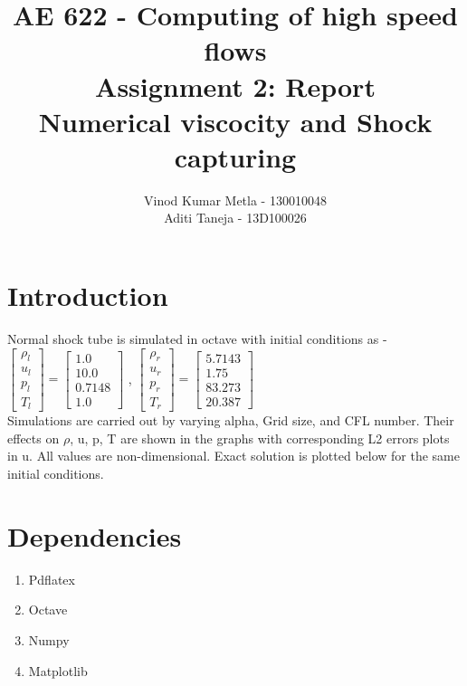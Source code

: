 \documentclass{article}
\title{AE 622 -  Computing of high speed flows\\ Assignment 2: Report \\ Numerical viscocity and Shock capturing}
\author{Vinod Kumar Metla - 130010048\\Aditi Taneja - 13D100026}
\date{}
\begin{document}
\maketitle
\newpage
\section*{Introduction}

Normal shock tube is simulated in octave with initial conditions as - 
\newline
    $\begin{bmatrix}
    \rho_l \\ 
    u_l \\
    p_l \\
    T_l
    \end{bmatrix} = \begin{bmatrix}
    1.0\\ 
    10.0 \\
    0.7148 \\
    1.0
    \end{bmatrix} $
 , 
$\begin{bmatrix}
    \rho_r \\ 
    u_r \\
    p_r \\
    T_r
    \end{bmatrix} = \begin{bmatrix}
    5.7143\\ 
    1.75 \\
    83.273 \\
    20.387
    \end{bmatrix} $
\\
Simulations are carried out by varying alpha, Grid size, and CFL number. Their effects on $\rho$, u, p, T are shown in the graphs with corresponding L2 errors plots in u. All values are non-dimensional.
\newline
Exact solution is plotted below for the same initial conditions.
\section*{Dependencies}
\begin{enumerate}
\item Pdflatex 
\item Octave
\item Numpy
\item Matplotlib

\end{enumerate}
\newpage
\end{document}

